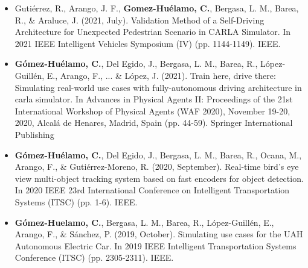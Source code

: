 \begin{refsection}
\begin{itemize}
\item Gutiérrez, R., Arango, J. F., \textbf{Gomez-Huélamo, C.}, Bergasa, L. M., Barea, R., \& Araluce, J. (2021, July). Validation Method of a Self-Driving Architecture for Unexpected Pedestrian Scenario in CARLA Simulator. In 2021 IEEE Intelligent Vehicles Symposium (IV) (pp. 1144-1149). IEEE.

\item \textbf{Gómez-Huélamo, C.}, Del Egido, J., Bergasa, L. M., Barea, R., López-Guillén, E., Arango, F., ... \& López, J. (2021). Train here, drive there: Simulating real-world use cases with fully-autonomous driving architecture in carla simulator. In Advances in Physical Agents II: Proceedings of the 21st International Workshop of Physical Agents (WAF 2020), November 19-20, 2020, Alcalá de Henares, Madrid, Spain (pp. 44-59). Springer International Publishing

\item \textbf{Gómez-Huélamo, C.}, Del Egido, J., Bergasa, L. M., Barea, R., Ocana, M., Arango, F., \& Gutiérrez-Moreno, R. (2020, September). Real-time bird’s eye view multi-object tracking system based on fast encoders for object detection. In 2020 IEEE 23rd International Conference on Intelligent Transportation Systems (ITSC) (pp. 1-6). IEEE.

\item \textbf{Gómez-Huelamo, C.}, Bergasa, L. M., Barea, R., López-Guillén, E., Arango, F., \& Sánchez, P. (2019, October). Simulating use cases for the UAH Autonomous Electric Car. In 2019 IEEE Intelligent Transportation Systems Conference (ITSC) (pp. 2305-2311). IEEE.

\end{itemize}

\end{refsection}



